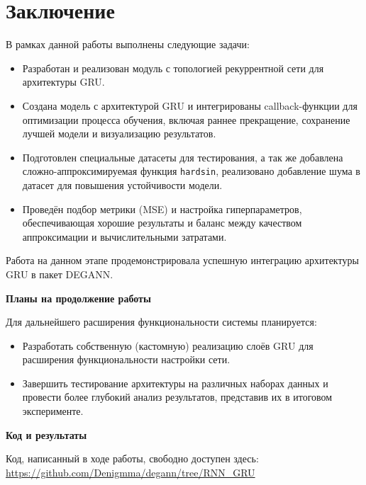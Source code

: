 
\section*{Заключение}

В рамках данной работы выполнены следующие задачи:
\begin{itemize}
    \item Разработан и реализован модуль с топологией рекуррентной сети для архитектуры GRU.
    \item Создана модель с архитектурой GRU и интегрированы callback-функции для оптимизации процесса обучения, включая раннее прекращение, сохранение лучшей модели и визуализацию результатов.
    \item Подготовлен специальные датасеты для тестирования, а так же добавлена сложно-аппроксимируемая функция \texttt{hardsin}, реализовано добавление шума в датасет для повышения устойчивости модели.
    \item Проведён подбор метрики (MSE) и настройка гиперпараметров, обеспечивающая хорошие результаты и баланс между качеством аппроксимации и вычислительными затратами.
\end{itemize}

Работа на данном этапе продемонстрировала успешную интеграцию архитектуры GRU в пакет DEGANN.

\textbf{Планы на продолжение работы}


Для дальнейшего расширения функциональности системы планируется:
\begin{itemize}
    \item Разработать собственную (кастомную) реализацию слоёв GRU для расширения функциональности настройки сети.
    \item Завершить тестирование архитектуры на различных наборах данных и провести более глубокий анализ результатов, представив их в итоговом эксперименте.
\end{itemize}

\textbf{Код и результаты}


Код, написанный в ходе работы, свободно доступен здесь: \href{https://github.com/Denigmma/degann/tree/RNN_GRU}{https://github.com/Denigmma/degann/tree/RNN_GRU}

